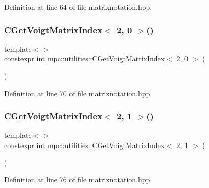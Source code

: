 Definition at line 64 of file matrixnotation.\+hpp.

\mbox{\label{namespacempc_1_1utilities_a611ba0637a7bbdf72d869e716512afdb}} 
\subsubsection{\texorpdfstring{C\+Get\+Voigt\+Matrix\+Index$<$ 2, 0 $>$()}{CGetVoigtMatrixIndex< 2, 0 >()}}
{\footnotesize\ttfamily template$<$$>$ \\
constexpr int \mbox{\hyperlink{namespacempc_1_1utilities_ad2c3679a8e007d8b5a333490886ef19d}{mpc\+::utilities\+::\+C\+Get\+Voigt\+Matrix\+Index}}$<$ 2, 0 $>$ (\begin{DoxyParamCaption}{ }\end{DoxyParamCaption})\hspace{0.3cm}{\ttfamily [inline]}}



Definition at line 70 of file matrixnotation.\+hpp.

\mbox{\label{namespacempc_1_1utilities_a6c8cf9c62a6dbebe475b757cde3f50d7}} 
\subsubsection{\texorpdfstring{C\+Get\+Voigt\+Matrix\+Index$<$ 2, 1 $>$()}{CGetVoigtMatrixIndex< 2, 1 >()}}
{\footnotesize\ttfamily template$<$$>$ \\
constexpr int \mbox{\hyperlink{namespacempc_1_1utilities_ad2c3679a8e007d8b5a333490886ef19d}{mpc\+::utilities\+::\+C\+Get\+Voigt\+Matrix\+Index}}$<$ 2, 1 $>$ (\begin{DoxyParamCaption}{ }\end{DoxyParamCaption})\hspace{0.3cm}{\ttfamily [inline]}}



Definition at line 76 of file matrixnotation.\+hpp.

